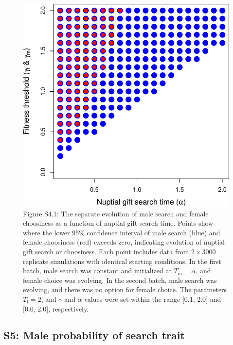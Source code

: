 \documentclass[
]{article}
\begin{document}
\begin{figure}
\centering
\includegraphics{index_files/figure-latex/unnamed-chunk-12-1.pdf}
\caption{Figure S4.1: The separate evolution of male search and female
choosiness as a function of nuptial gift search time. Points show where
the lower 95\% confidence interval of male search (blue) and female
choosiness (red) exceeds zero, indicating evolution of nuptial gift
search or choosiness. Each point includes data from \(2 \times 3000\)
replicate simulations with identical starting conditions. In the first
batch, male search was constant and initialized at
\(T_{\mathrm{m}} = \alpha\), and female choice was evolving. In the
second batch, male search was evolving, and there was no option for
female choice. The parameters \(T_{\mathrm{f}}=2\), and \(\gamma\) and
\(\alpha\) values were set within the range {[}0.1, 2.0{]} and {[}0.0,
2.0{]}, respectively.}
\end{figure}

\captionsetup{labelformat=default}

\hypertarget{s5-male-probability-of-search-trait}{%
\subsection{S5: Male probability of search
trait}\label{s5-male-probability-of-search-trait}}
\end{document}
